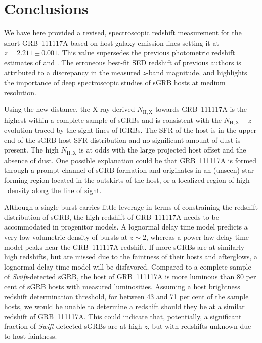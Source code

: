\documentclass{aa}    %
\begin{document}
\section{Conclusions}

We have here provided a revised, spectroscopic redshift measurement for the
short GRB~111117A based on host galaxy emission lines setting it at $z = 2.211
\pm 0.001$. This value supersedes the previous photometric redshift estimates of
\citet{Margutti2012} and \citet{Sakamoto2013}. The erroneous best-fit SED
redshift of previous authors is attributed to a discrepancy in the measured
$z$-band magnitude, and highlights the importance of deep spectroscopic studies
of sGRB hosts at medium resolution.

Using the new distance, the X-ray derived $N_\mathrm{H,X}$ towards GRB~111117A
is the highest within a complete sample of sGRBs and is consistent with the
$N_\mathrm{H,X}-z$ evolution traced by the sight lines of lGRBs. The SFR of the
host is in the upper end of the sGRB host SFR distribution and no significant
amount of dust is present. The high $N_\mathrm{H,X}$ is at odds with the large
projected host offset and the absence of dust. One possible explanation could be
that GRB~111117A is formed through a prompt channel of sGRB formation and
originates in an (unseen) star forming region located in the outskirts of the
host, or a localized region of high \hi~density along the line of sight.

Although a single burst carries little leverage in terms of constraining the
redshift distribution of sGRB, the high redshift of GRB~111117A needs to be
accommodated in progenitor models. A lognormal delay time model predicts a very
low volumetric density of bursts at $z \sim 2$, whereas a power law delay time
model peaks near the GRB~111117A redshift. If more sGRBs are at similarly high
redshifts, but are missed due to the faintness of their hosts and afterglows, a
lognormal delay time model will be disfavored. Compared to a complete sample of
\textit{Swift}-detected sGRB, the host of GRB~111117A is more luminous than 80
per cent of sGRB hosts with measured luminosities. Assuming a host brightness
redshift determination threshold, for between 43 and 71 per cent of the sample
hosts, we would be unable to determine a redshift should they be at a similar
redshift of GRB~111117A. This could indicate that, potentially, a significant
fraction of \textit{Swift}-detected sGRBs are at high $z$, but with redshifts
unknown due to host faintness.
\end{document}
